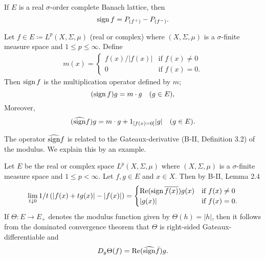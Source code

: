 If $E$ is a real $\sigma$-order complete Banach lattice, then
\begin{equation}\label{eq:c2-2.5}
	\operatorname{sign} f = P_{(f^{+})} - P_{(f^{-})}  .
\end{equation}
\begin{example}\label{ex:c2-2.2}
%
%
%
Let $f \in E \coloneqq L^p(X,\Sigma,\mu)$ (real or complex) where $(X,\Sigma,\mu)$ is a $\sigma$-finite measure space and $1 \leq p \leq \infty$.
Define
\begin{align*}
	m(x) = 
	\begin{cases}
    	f(x)/|f(x)| & \text{if } f(x) \neq 0 \\
    	0 & \text{if } f(x) = 0  .
	\end{cases}
\end{align*}
Then $\operatorname{sign} f$ is the multiplication operator defined by $m$; \ie
\[
	(\operatorname{sign} f)g = m \cdot g \quad (g \in E), 
\]
Moreover, 
\[
	(\widehat{\operatorname{sign}} f)g = m \cdot g + 1_{[f(x)=0]}|g| \quad (g \in E).
\]
\end{example}
The operator $\widehat{\operatorname{sign}} f$ is related to the Gateaux-derivative (B-II, Definition 3.2) of the modulus.
We explain this by an example.
\begin{example}\label{ex:c2-2.3}
%
%
%
Let $E$ be the real or complex space $L^p(X,\Sigma,\mu)$ where $(X,\Sigma,\mu)$ is a $\sigma$-finite measure space and $1 \leq p < \infty$.
Let $f,g \in E$ and $x \in X$.
Then by B-II, Lemma 2.4 
\begin{align*}
\lim_{t \downarrow 0} 1/t\, (|f(x)+tg(x)|-|f(x)|) = 
\begin{cases}
    \mathop{}\!\mathrm{Re} (\operatorname{sign} \overline{f(x)})g(x) & \text{if } f(x) \neq 0 \\
    |g(x)| & \text{if } f(x) = 0.
\end{cases}
\end{align*}
If $\Theta \colon E \to E_{+}$ denotes the modulus function given by $\Theta(h) = |h|$, then it follows from the dominated convergence theorem that $\Theta$ is right-sided Gateaux-differentiable and
\begin{equation}\label{eq:c2-2.6}
D_{g}\Theta(f) = \mathop{}\!\mathrm{Re}(\widehat{\operatorname{sign}} \bar{f})g.
\end{equation}
\end{example}
